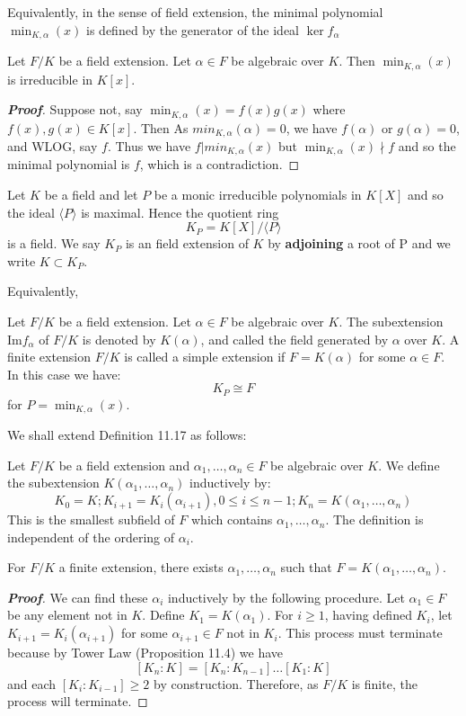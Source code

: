 Equivalently, in the sense of field extension, the minimal polynomial $\min_{K,\alpha}(x)$ is defined by the generator of the ideal $\ker{f_\alpha}$
\begin{lemma} Let $F/K$ be a field extension. Let $\alpha \in F$ be algebraic over $K$. Then
$\min_{K,\alpha}(x)$ is irreducible in $K[x]$.
\end{lemma}
\begin{proof}[\bf Proof] Suppose not, say $\min_{K,\alpha}(x)=f(x)g(x)$ where $f(x),g(x) \in K[x]$. Then
As $min_{K,\alpha}(\alpha)=0$, we have $f(\alpha)$ or $g(\alpha)=0$, and WLOG, say $f$. Thus we have
$f|min_{K,\alpha}(x)$ but $\min_{K,\alpha}(x) \nmid f$ and so the minimal polynomial is $f$, which is a contradiction.
\end{proof}
\begin{definition}
Let $K$ be a field and let $P$ be a monic irreducible polynomials in $K[X]$ and so the ideal
$\langle P \rangle$ is maximal. Hence the quotient ring
$$K_P=K[X]/\langle P \rangle$$ is a field. We say $K_P$ is an field extension of $K$ by {\bf adjoining} a root of P and we write $K \subset K_P$.
\end{definition}
Equivalently,
\begin{definition} Let $F/K$ be a field extension. Let $\alpha \in F$ be algebraic over $K$. The subextension Im$f_\alpha$ of $F/K$ is denoted by $K(\alpha)$, and called the field generated by $\alpha$ over $K$. A finite extension $F/K$ is called a simple extension if $F=K(\alpha)$ for some $\alpha \in F$. In this case we have:
$$K_P \cong F$$ for $P=\min_{K,\alpha}(x)$.
\end{definition}
We shall extend Definition 11.17 as follows:
\begin{definition} Let $F/K$ be a field extension and $\alpha_1, \ldots,\alpha_n \in F$ be algebraic over $K$. We define the subextension $K(\alpha_1,\ldots,\alpha_n)$ inductively by:
$$K_0=K; K_{i+1}=K_i(\alpha_{i+1}), 0 \le i \le n-1; K_n=K(\alpha_1,\ldots,\alpha_n)$$
This is the smallest subfield of $F$ which contains $\alpha_1,\ldots,\alpha_n$. The definition is independent of the ordering of $\alpha_i$.
\end{definition}
\begin{proposition} For $F/K$ a finite extension, there exists $\alpha_1,\ldots,\alpha_n$ such that
$F=K(\alpha_1,\ldots,\alpha_n)$.
\end{proposition}
\begin{proof}[\bf Proof] We can find these $\alpha_i$ inductively by the following procedure. Let $\alpha_1 \in F$ be any element not in $K$. Define $K_1=K(\alpha_1)$. For $i \ge 1$, having defined $K_i$, let $K_{i+1}=K_i(\alpha_{i+1})$ for some $\alpha_{i+1} \in F$ not in $K_i$. This process must terminate because by Tower Law (Proposition 11.4) we have
$$[K_n:K]=[K_n:K_{n-1}]\ldots [K_1:K]$$ and each $[K_i:K_{i-1}] \ge 2$ by construction. Therefore, as $F/K$ is finite, the process will terminate.
\end{proof}
